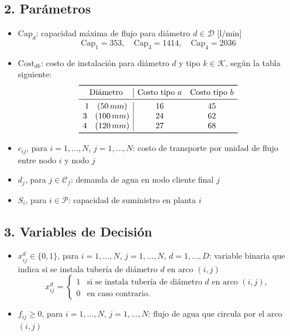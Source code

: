 \documentclass[12pt]{article}
\begin{document}
\subsection*{2. Parámetros}

\begin{itemize}
  \item \( \text{Cap}_d \): capacidad máxima de flujo para diámetro \( d \in \mathcal{D} \) [l/min]
  \[
  \text{Cap}_1 = 353, \quad \text{Cap}_3 = 1414, \quad \text{Cap}_4 = 2036
  \]
  
  \item \( \text{Cost}_{dk} \): costo de instalación para diámetro \( d \) y tipo \( k \in \mathcal{K} \), según la tabla siguiente:
  \[
  \begin{array}{c|cc}
  \toprule
  \text{Diámetro} & \text{Costo tipo } a & \text{Costo tipo } b \\
  \midrule
  1 \quad (50\,mm) & 16 & 45 \\
  3 \quad (100\,mm) & 24 & 62 \\
  4 \quad (120\,mm) & 27 & 68 \\
  \bottomrule
  \end{array}
  \]

  \item \( c_{ij} \), para \( i=1,\ldots,N \), \( j=1,\ldots,N \): costo de transporte por unidad de flujo entre nodo \( i \) y nodo \( j \)
  \item \( d_j \), para \( j \in \mathcal{C}_f \): demanda de agua en nodo cliente final \( j \)
  \item \( S_i \), para \( i \in \mathcal{P} \): capacidad de suministro en planta \( i \)
\end{itemize}

\subsection*{3. Variables de Decisión}

\begin{itemize}
  \item \( x_{ij}^d \in \{0,1\} \), para \( i=1,\ldots,N \), \( j=1,\ldots,N \), \( d=1,\ldots,D \): variable binaria que indica si se instala tubería de diámetro \( d \) en arco \( (i,j) \)
  \[
  x_{ij}^d = \begin{cases}
  1 & \text{si se instala tubería de diámetro } d \text{ en arco } (i,j), \\
  0 & \text{en caso contrario}.
  \end{cases}
  \]

  \item \( f_{ij} \geq 0 \), para \( i=1,\ldots,N \), \( j=1,\ldots,N \): flujo de agua que circula por el arco \( (i,j) \)
\end{itemize}
\end{document}

